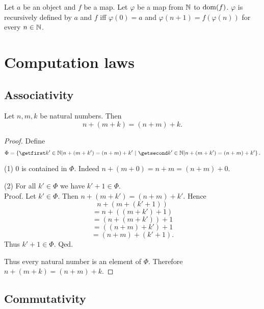\documentclass[../arithmetic.tex]{subfiles}
\begin{document}
  \begin{forthel}
    \begin{proposition}
      Let $a$ be an object and $f$ be a map.
      Let $\varphi$ be a map from $\mathbb{N}$ to $\operatorname{dom}(f)$.
      $\varphi$ is recursively defined by $a$ and $f$ iff $\varphi(0) = a$ and
      $\varphi(n + 1) = f(\varphi(n))$ for every $n \in \mathbb{N}$.
    \end{proposition}
  \end{forthel}


  \section{Computation laws}

  \subsection*{Associativity}

  \begin{forthel}
    \begin{proposition}
      Let $n, m, k$ be natural numbers.
      Then \[ n + (m + k) = (n + m) + k. \]
    \end{proposition}
    \begin{proof}
      Define \[ \Phi = \class{ k' \in \Nat | n + (m + k') = (n + m) + k'}. \]

      (1) $0$ is contained in $\Phi$.
      Indeed $n + (m + 0) = n + m = (n + m) + 0$.

      (2) For all $k' \in \Phi$ we have $k' + 1 \in \Phi$. \\
      Proof.
        Let $k' \in \Phi$.
        Then $n + (m + k') = (n + m) + k'$.
        Hence
        \[  n + (m + (k' + 1))        \]
        \[    = n + ((m + k') + 1)    \]
        \[    = (n + (m + k')) + 1    \]
        \[    = ((n + m) + k') + 1    \]
        \[    = (n + m) + (k' + 1).   \]
        Thus $k' + 1 \in \Phi$.
      Qed.

      Thus every natural number is an element of $\Phi$.
      Therefore $n + (m + k) = (n + m) + k$.
    \end{proof}
  \end{forthel}


  \subsection*{Commutativity}
\end{document}
